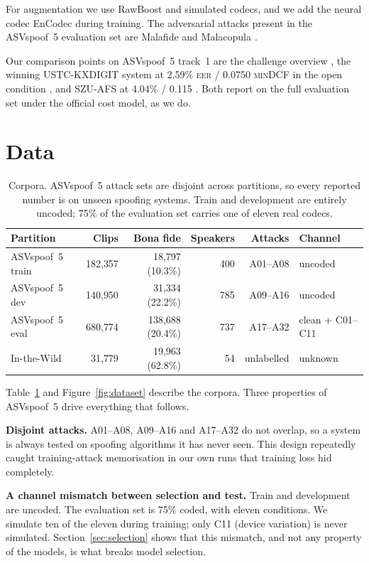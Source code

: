 \documentclass[11pt,a4paper]{article}
\newcommand{\eer}{\textsc{eer}}
\newcommand{\mindcf}{\textsc{minDCF}}
\begin{document}
For augmentation we use RawBoost \citep{rawboost} and simulated codecs, and we add the neural codec
EnCodec \citep{encodec} during training. The adversarial attacks present in the ASVspoof~5 evaluation
set are Malafide \citep{malafide} and Malacopula \citep{malacopula}.

Our comparison points on ASVspoof~5 track~1 are the challenge overview \citep{asvspoof5}, the winning
USTC-KXDIGIT system at 2.59\% \eer{} / 0.0750 \mindcf{} in the open condition \citep{ustc2024}, and
SZU-AFS at 4.04\% / 0.115 \citep{szuafs}. Both report on the full evaluation set under the official
cost model, as we do.

\section{Data}
\label{sec:data}

\begin{table}[t]
\centering
\small
\caption{Corpora. ASVspoof~5 attack sets are disjoint across partitions, so every reported number is
on unseen spoofing systems. Train and development are entirely uncoded; 75\% of the evaluation set
carries one of eleven real codecs.}
\label{tab:data}
\begin{tabular}{lrrrrl}
\toprule
Partition & Clips & Bona fide & Speakers & Attacks & Channel \\
\midrule
ASVspoof~5 train & 182{,}357 & 18{,}797 (10.3\%) & 400 & A01--A08 & uncoded \\
ASVspoof~5 dev   & 140{,}950 & 31{,}334 (22.2\%) & 785 & A09--A16 & uncoded \\
ASVspoof~5 eval  & 680{,}774 & 138{,}688 (20.4\%) & 737 & A17--A32 & clean + C01--C11 \\
In-the-Wild      & 31{,}779  & 19{,}963 (62.8\%) & 54  & unlabelled & unknown \\
\bottomrule
\end{tabular}
\end{table}

Table~\ref{tab:data} and Figure~\ref{fig:dataset} describe the corpora. Three properties of
ASVspoof~5 \citep{asvspoof5} drive everything that follows.

\textbf{Disjoint attacks.} A01--A08, A09--A16 and A17--A32 do not overlap, so a system is always
tested on spoofing algorithms it has never seen. This design repeatedly caught training-attack
memorisation in our own runs that training loss hid completely.

\textbf{A channel mismatch between selection and test.} Train and development are uncoded. The
evaluation set is 75\% coded, with eleven conditions. We simulate ten of the eleven during training;
only C11 (device variation) is never simulated. Section~\ref{sec:selection} shows that this
mismatch, and not any property of the models, is what breaks model selection.
\end{document}
